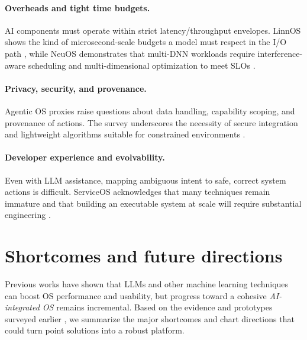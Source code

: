 \documentclass{article}
\begin{document}
\paragraph{Overheads and tight time budgets.}
AI components must operate within strict latency/throughput envelopes. LinnOS shows the kind of microsecond-scale budgets a model must respect in the I/O path \cite{hao2020linnos}, while NeuOS demonstrates that multi-DNN workloads require interference-aware scheduling and multi-dimensional optimization to meet SLOs \cite{bateni2020neuos}. %

\paragraph{Privacy, security, and provenance.}
Agentic OS proxies raise questions about data handling, capability scoping, and provenance of actions. The survey underscores the necessity of secure integration and lightweight algorithms suitable for constrained environments \cite{zhang2024systematic}. %

\paragraph{Developer experience and evolvability.}
Even with LLM assistance, mapping ambiguous intent to safe, correct system actions is difficult. ServiceOS acknowledges that many techniques remain immature and that building an executable system at scale will require substantial engineering \cite{liu2021serviceos}. %

\section{Shortcomes and future directions}
Previous works have shown that LLMs and other machine learning techniques can boost OS performance and usability, but progress toward a cohesive \emph{AI-integrated OS} remains incremental. Based on the evidence and prototypes surveyed earlier \cite{zhang2024systematic,liu2021serviceos,hao2020linnos,bateni2020neuos,goodarzy2021smartos,kamath2024llamas,he2024peros,packer2023memgpt}, we summarize the major shortcomes and chart directions that could turn point solutions into a robust platform.
\end{document}
